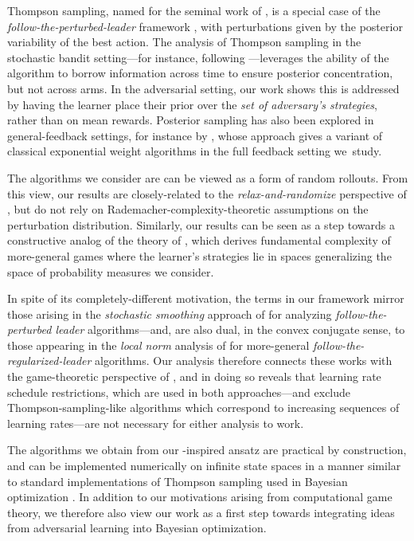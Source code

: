 \documentclass[preprint,12pt]{colt2025}
\begin{document}
Thompson sampling, named for the seminal work of \textcite{thompson1933likelihood,thompson1935theory}, is a special case of the \emph{follow-the-perturbed-leader} framework \cite{kalai2005efficient}, with perturbations given by the posterior variability of the best action.
The analysis of Thompson sampling in the stochastic bandit setting---for instance, following \textcite{russo2016information}---leverages the ability of the algorithm to borrow information across time to ensure posterior concentration, but not across arms.
In the adversarial setting, our work shows this is addressed by having the learner place their prior over the \emph{set of adversary's strategies}, rather than on mean rewards.
Posterior sampling has also been explored in general-feedback settings, for instance by \textcite{xu2023bayesian}, whose approach gives a variant of classical exponential weight algorithms in the full feedback setting we~study.

The algorithms we consider are can be viewed as a form of random rollouts.
From this view, our results are closely-related to the \emph{relax-and-randomize} perspective of \textcite{rakhlin2012relax}, but do not rely on Rademacher-complexity-theoretic assumptions on the perturbation distribution.
Similarly, our results can be seen as a step towards a constructive analog of the theory of \textcite{sridharan2010convex}, which derives fundamental complexity of more-general games where the learner's strategies lie in spaces generalizing the space of probability measures we consider.

In spite of its completely-different motivation, the terms in our framework mirror those arising in the \emph{stochastic smoothing} approach of \textcite{abernethy2016perturbation} for analyzing \emph{follow-the-perturbed leader} algorithms---and, are also dual, in the convex conjugate sense, to those appearing in the \emph{local norm} analysis of \textcite{orabona2019modern} for more-general \emph{follow-the-regularized-leader} algorithms.
Our analysis therefore connects these works with the game-theoretic perspective of \textcite{gravin2016towards}, and in doing so reveals that learning rate schedule restrictions, which are used in both approaches---and exclude Thompson-sampling-like algorithms which correspond to increasing sequences of learning rates---are not necessary for either analysis to work.

The algorithms we obtain from our \textcite{gravin2016towards}-inspired ansatz are practical by construction, and can be implemented numerically on infinite state spaces in a manner similar to standard implementations of Thompson sampling used in Bayesian optimization \cite{wilson20,wilson21}.
In addition to our motivations arising from computational game theory, we therefore also view our work as a first step towards integrating ideas from adversarial learning into Bayesian optimization.
\end{document}
